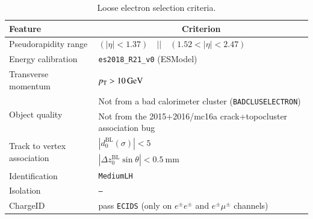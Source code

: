 \begin{table}[ht]
  \caption{Loose electron selection criteria.}%
  \label{tab:object:loose_electron}
  \centering
  \begin{tabular}{ll}
    \toprule
    Feature & \multicolumn{1}{c}{Criterion} \\
    \midrule
    Pseudorapidity range & \((|\eta| < 1.37) \quad || \quad (1.52 < |\eta| < 2.47)\) \\
    Energy calibration & \texttt{es2018\_R21\_v0} (ESModel)\\
    Transverse momentum & \(\pT > \SI[parse-numbers=false]{10}{\GeV}\) \\
    \midrule
    \multirow{2}{*}{Object quality} & Not from a bad calorimeter cluster (\texttt{BADCLUSELECTRON}) \\ %
      & Not from the 2015+2016/mc16a crack+topocluster association bug   \\
    \midrule
    \multirow{2}{*}{Track to vertex association} & \(|d_{0}^{\text{BL}}(\sigma)| < 5\) \\ %
    & \(|\Delta z_{0}^{\text{BL}} \sin{\theta}| < \SI[parse-numbers=false]{0.5}{\mm}\) \\
    \midrule
    Identification & \texttt{MediumLH} \\
    Isolation & \texttt{-- } \\
    ChargeID & pass \texttt{ECIDS}  (only on $e^\pm e^\pm$ and  $e^\pm \mu^\pm$ channels)\\
      \bottomrule
  \end{tabular}
\end{table}






